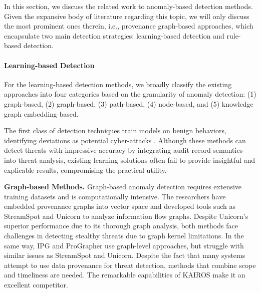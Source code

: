 

In this section, we discuss the related work to anomaly-based detection methods. Given the expansive body of literature regarding this topic, we will only discuss the most prominent ones therein, i.e., provenance graph-based approaches, which encapsulate two main detection strategies: learning-based detection and rule-based detection.


\paragraph{Learning-based Detection}
For the learning-based detection methods, we broadly classify the existing approaches into four categories based on the granularity of anomaly detection: (1) graph-based, (2) graph-based, (3) path-based, (4) node-based, and (5) knowledge graph embedding-based.

The first class of detection techniques train models on benign behaviors, identifying deviations as potential cyber-attacks . Although these methods can detect threats with impressive accuracy by integrating audit record semantics into threat analysis, existing learning solutions often fail to provide insightful and explicable results, compromising the practical utility.
% 

\noindent
{\bf Graph-based Methods.} Graph-based anomaly detection requires extensive training datasets and is computationally intensive. The researchers have embedded provenance graphs into vector space and developed tools such as StreamSpot \cite{manzoor2016fast} and Unicorn \cite{han2020unicorn} to analyze information flow graphs. Despite Unicorn's superior performance due to its thorough graph analysis, both methods face challenges in detecting stealthy threats due to graph kernel limitations. In the same way, IPG \cite{li2021hierarchical} and ProGrapher \cite{yang2023prographer} use graph-level approaches, but struggle with similar issues as StreamSpot and Unicorn. Despite the fact that many systems attempt to use data provenance for threat detection, methods that combine scope and timeliness are needed. The remarkable capabilities of KAIROS \cite{cheng2023kairos} make it an excellent competitor.

